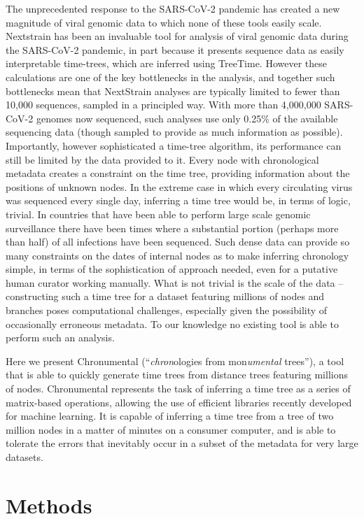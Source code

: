The unprecedented response to the SARS-CoV-2 pandemic has created a new magnitude of viral genomic data to which none of these tools easily scale. Nextstrain \citep{Hadfield2018-fb} has been an invaluable tool for analysis of viral genomic data during the SARS-CoV-2 pandemic, in part because it presents sequence data as easily interpretable time-trees, which are inferred using TreeTime. However these calculations are one of the key bottlenecks in the analysis, and together such bottlenecks mean that NextStrain analyses are typically limited to fewer than 10,000 sequences, sampled in a principled way. With more than 4,000,000 SARS-CoV-2 genomes now sequenced, such analyses use only 0.25\% of the available sequencing data (though sampled to provide as much information as possible). Importantly, however sophisticated a time-tree algorithm, its performance can still be limited by the data provided to it. Every node with chronological metadata creates a constraint on the time tree, providing information about the positions of unknown nodes. In the extreme case in which every circulating virus was sequenced every single day, inferring a time tree would be, in terms of logic, trivial. In countries that have been able to perform large scale genomic surveillance there have been times where a substantial portion (perhaps more than half) of all infections have been sequenced. Such dense data can provide so many constraints on the dates of internal nodes as to make inferring chronology simple, in terms of the sophistication of approach needed, even for a putative human curator working manually. What is not trivial is the scale of the data -- constructing such a time tree for a dataset featuring millions of nodes and branches poses computational challenges, especially given the possibility of occasionally erroneous metadata. To our knowledge no existing tool is able to perform such an analysis.

Here we present Chronumental (``\textit{chron}ologies from mon\textit{umental} trees''), a tool that is able to quickly generate time trees from distance trees featuring millions of nodes. Chronumental represents the task of inferring a time tree as a series of matrix-based operations, allowing the use of efficient libraries recently developed for machine learning. It is capable of inferring a time tree from a tree of two million nodes in a matter of minutes on a consumer computer, and is able to tolerate the errors that inevitably occur in a subset of the metadata for very large datasets.


\section*{Methods}

